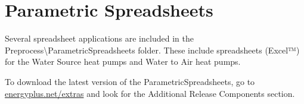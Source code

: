 \chapter{Parametric Spreadsheets}\label{parametric-spreadsheets}

Several spreadsheet applications are included in the Preprocess\textbackslash{}ParametricSpreadsheets folder. These include spreadsheets (Excel™) for the Water Source heat pumps and Water to Air heat pumps.

To download the latest version of the ParametricSpreadsheets, go to \href{https://energyplus.net/extras}{energyplus.net/extras} and look for the Additional Release Components section.